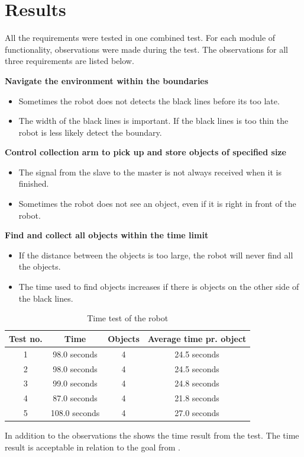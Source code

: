 \section{Results}

All the requirements were tested in one combined test. For each module of functionality, observations were made during the test. The observations for all three requirements are listed below.

\textbf{Navigate the environment within the boundaries}
\begin{itemize}
\item Sometimes the robot does not detects the black lines before its too late.
\item The width of the black lines is important. If the black lines is too thin the robot is less likely detect the boundary.
\end{itemize}

\textbf{Control collection arm to pick up and store objects of specified size}
\begin{itemize}
\item The signal from the slave to the master is not always received when it is finished.
\item Sometimes the robot does not see an object, even if it is right in front of the robot.
\end{itemize}

\textbf{Find and collect all objects within the time limit}
\begin{itemize}
\item If the distance between the objects is too large, the robot will never find all the objects. 
\item The time used to find objects increases if there is objects on the other side of the black lines.  
\end{itemize}

\begin{table}[H]
	\centering
   \begin{tabular}{|c|c|c|c|}
   \hline  
   Test no. & Time & Objects & Average time pr. object \\ \hline
      1    & 98.0 seconds    & 4 & 24.5 seconds   \\ \hline
      2    & 98.0 seconds    & 4 & 24.5 seconds  \\ \hline
      3    & 99.0 seconds    & 4 & 24.8 seconds  \\ \hline
      4    & 87.0 seconds    & 4 & 21.8 seconds  \\ \hline
      5    & 108.0 seconds   & 4 & 27.0 seconds  \\ \hline
   \end{tabular}
   \caption{\label{table:FinalTimeTestRobot} Time test of the robot}
\end{table}

In addition to the observations the  shows the time result from the test. The time result is acceptable in relation to the goal from .









